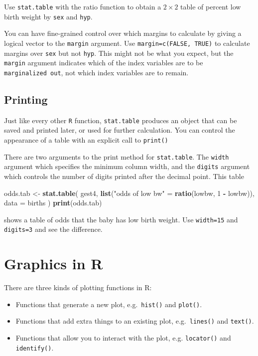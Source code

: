 \documentclass[
]{book}
\newenvironment{Shaded}{\begin{snugshade}}{\end{snugshade}}
\newcommand{\AttributeTok}[1]{\textcolor[rgb]{0.13,0.29,0.53}{#1}}
\newcommand{\DecValTok}[1]{\textcolor[rgb]{0.00,0.00,0.81}{#1}}
\newcommand{\FunctionTok}[1]{\textcolor[rgb]{0.13,0.29,0.53}{\textbf{#1}}}
\newcommand{\NormalTok}[1]{#1}
\newcommand{\OtherTok}[1]{\textcolor[rgb]{0.56,0.35,0.01}{#1}}
\newcommand{\SpecialCharTok}[1]{\textcolor[rgb]{0.81,0.36,0.00}{\textbf{#1}}}
\newcommand{\StringTok}[1]{\textcolor[rgb]{0.31,0.60,0.02}{#1}}
\providecommand{\tightlist}{%
  \setlength{\itemsep}{0pt}\setlength{\parskip}{0pt}}
\begin{document}
Use \texttt{stat.table} with the ratio function to obtain a \(2\times 2\) table of percent low birth weight by \texttt{sex} and \texttt{hyp}.

You can have fine-grained control over which margins to calculate by
giving a logical vector to the \texttt{margin} argument. Use \texttt{margin=c(FALSE,\ TRUE)}
to calculate margins over \texttt{sex} but not
\texttt{hyp}. This might not be what you expect, but the \texttt{margin}
argument indicates which of the index variables are to be \texttt{marginalized\ out},
not which index variables are to remain.

\section{Printing}\label{printing}

Just like every other \texttt{R} function, \texttt{stat.table} produces
an object that can be saved and printed later, or used for further
calculation. You can control the appearance of a table with an explicit
call to \texttt{print()}

There are two arguments to the print method for \texttt{stat.table}. The
\texttt{width} argument which specifies the minimum column width, and the
\texttt{digits} argument which controls
the number of digits printed after the decimal point. This table

\begin{Shaded}
\begin{Highlighting}[]
\NormalTok{odds.tab }\OtherTok{\textless{}{-}} 
  \FunctionTok{stat.table}\NormalTok{(}
\NormalTok{    gest4, }
    \FunctionTok{list}\NormalTok{(}\StringTok{"odds of low bw"} \OtherTok{=} \FunctionTok{ratio}\NormalTok{(lowbw, }\DecValTok{1} \SpecialCharTok{{-}}\NormalTok{ lowbw)),}
    \AttributeTok{data =}\NormalTok{ births}
\NormalTok{)}
\FunctionTok{print}\NormalTok{(odds.tab)}
\end{Highlighting}
\end{Shaded}

shows a table of odds that the baby has low birth weight. Use
\texttt{width=15} and \texttt{digits=3} and see the difference.

\chapter{Graphics in R}\label{graphics-in-r}

There are three kinds of plotting functions in R:

\begin{itemize}
\tightlist
\item
  Functions that generate a new plot, e.g.~\texttt{hist()} and
  \texttt{plot()}.
\item
  Functions that add extra things to an existing plot,
  e.g.~\texttt{lines()} and \texttt{text()}.
\item
  Functions that allow you to interact with the plot, e.g.
  \texttt{locator()} and \texttt{identify()}.
\end{itemize}
\end{document}
